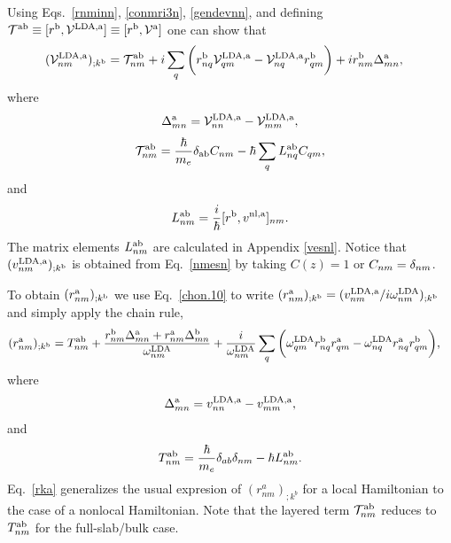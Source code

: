 \documentclass[floatfix,prb,aps,superscriptaddress,11pt,preprint,letterpaper]{revtex4}
\def\chon{black}
\begin{document}
Using Eqs.~\eqref{rnminn}, \eqref{conmri3n}, \eqref{gendevnn}, and
defining 
$
{\cal T}^{\mathrm{a}\mathrm{b}}\equiv[r^{\mathrm{b}},{\mathbf{\cal V}}^{\mathrm{LDA},\mathrm{a}}]
\equiv
[r^{\mathrm{b}},{\mathbf{\cal V}}^{\mathrm{a}}]
$
one can show that{\color{\chon} 
\begin{align}\label{nmesn}
({\mathbf{\cal V}}^{\mathrm{LDA},\mathrm{a}}_{nm})_{;k^{\mathrm{b}}}&=
{\cal T}_{nm}^{\mathrm{a}\mathrm{b}}
+i
\sum_{q}
\bigg(
r^{\mathrm{b}}_{nq}  
{\mathbf{\cal V}}^{\mathrm{LDA},\mathrm{a}}_{q m}
-
{\mathbf{\cal V}}^{\mathrm{LDA},\mathrm{a}}_{nq}   
r^{\mathrm{b}}_{q m}
\bigg)  
+i  
r^{\mathrm{b}}_{nm}
\Delta^{\mathrm{a}}_{mn}
,
\end{align}}
where
\begin{eqnarray}\label{tdel}
\Delta^{\mathrm{a}}_{mn}
=
{\mathbf{\cal V}}^{\mathrm{LDA},\mathrm{a}}_{nn}  
-
{\mathbf{\cal V}}^{\mathrm{LDA},\mathrm{a}}_{mm}  
,
\end{eqnarray} 
\begin{align}\label{tau.1}
{\cal T}_{nm}^{\mathrm{a}\mathrm{b}}
=
\frac{\hbar}{m_e}\delta_{\mathrm{a}\mathrm{b}} 
C_{nm} 
-\hbar 
\sum_q  
L^{\mathrm{a}\mathrm{b}}_{nq} 
C_{qm} 
,
\end{align}   
and
\begin{align}\label{lab}
L_{nm}^{\mathrm{a}\mathrm{b}}
=\frac{i}{\hbar}[r^{\mathrm{b}},v^{\mathrm{nl},\mathrm{a}}]_{nm}
.
\end{align}  
The matrix elements $L^{\mathrm{a}\mathrm{b}}_{nm}$
are calculated in Appendix \ref{vesnl}.
Notice that
{\color{\chon} 
$(v^{\mathrm{LDA},\mathrm{a}}_{nm})_{;k^{\mathrm{b}}}$} is obtained 
from Eq.~\eqref{nmesn} by 
taking 
{\color{\chon} $C(z)=1$ or $C_{nm}=\delta_{nm}$.}

To obtain $(r^{\mathrm{a}}_{nm})_{;k^{\mathrm{b}}}$ we use Eq.~\eqref{chon.10} to
write
$(r^{\mathrm{a}}_{nm})_{;k^{\mathrm{b}}}
=(v^{\mathrm{LDA},\mathrm{a}}_{nm}/i\omega^{\mathrm{LDA}}_{nm})_{;k^{\mathrm{b}}}
$ {\color{\chon} and} simply apply the chain rule,
\begin{align}\label{rka}
(r^{\mathrm{a}}_{nm})_{;k^{\mathrm{b}}}
&=
T^{\mathrm{a}\mathrm{b}}_{nm}
+
\frac{ 
r^{\mathrm{b}}_{nm}
\Delta^{\mathrm{a}}_{mn}
+r^{\mathrm{a}}_{nm}
\Delta^{\mathrm{b}}_{mn}
}
{\omega^{\mathrm{LDA}}_{nm}}
+
\frac{i}{\omega^{\mathrm{LDA}}_{nm}}
\sum_{q}
\bigg(
\omega^{\mathrm{LDA}}_{q m} 
r^{\mathrm{b}}_{nq} 
r^{\mathrm{a}}_{q m}
-
\omega^{\mathrm{LDA}}_{nq} 
r^{\mathrm{a}}_{nq} 
r^{\mathrm{b}}_{q m}
\bigg)
,
\end{align} 
where 
\begin{eqnarray}\label{del}
\Delta^{\mathrm{a}}_{mn}
=
v^{\mathrm{LDA},\mathrm{a}}_{nn}  
-
v^{\mathrm{LDA},\mathrm{a}}_{mm}  
,
\end{eqnarray}
and{\color{\chon} 
\begin{align}\label{tau.1n} 
T_{nm}^{\mathrm{a}\mathrm{b}}
=\frac{\hbar}{m_e}\delta_{ab}\delta_{nm} 
-\hbar L^{\mathrm{a}\mathrm{b}}_{nm} 
.
\end{align}}
Eq.~\eqref{rka} generalizes the usual expresion of
$(r^a_{nm})_{;k^b}$ for {\color{\chon} a} local 
{\color{\chon} Hamiltonian}
\cite{aversaPRB95,nastosPRB05,cabellosPRB09,rashkeevPRB98}
to
the case of a
nonlocal Hamiltonian.
Note that the layered term
${\cal T}^{\mathrm{a}\mathrm{b}}_{nm}$ reduces to $T^{\mathrm{a}\mathrm{b}}_{nm}$
{\color{\chon} for the full-slab/bulk case.}
\end{document}

